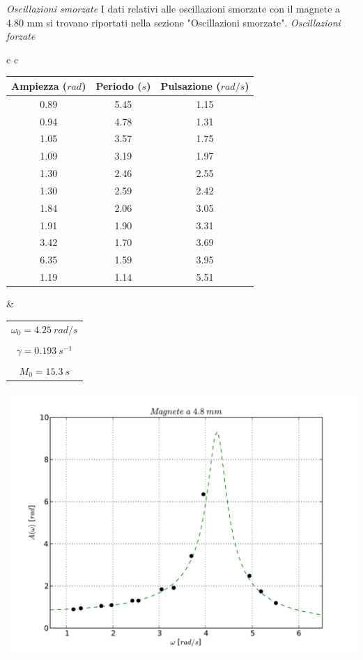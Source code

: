 \textit{Oscillazioni smorzate}
I dati relativi alle oscillazioni smorzate con il magnete a 4.80 mm si trovano riportati nella sezione "Oscillazioni smorzate".
\textit{Oscillazioni forzate}
\begin{center}

\begin{tabular}{c c}

\begin{tabular}{c | c | c}
\textbf{Ampiezza ($rad$)} & \textbf{Periodo ($s$)} & \textbf{Pulsazione ($rad/s$)}\\
\midrule
0.89 & 5.45 & 1.15\\
0.94 & 4.78 & 1.31\\
1.05 & 3.57 & 1.75\\
1.09 & 3.19 & 1.97\\
1.30 & 2.46 & 2.55\\
1.30 & 2.59 & 2.42\\
1.84 & 2.06 & 3.05\\
1.91 & 1.90 & 3.31\\
3.42 & 1.70 & 3.69\\
6.35 & 1.59 & 3.95\\
1.19 & 1.14 & 5.51\\
\end{tabular}

& \hspace{1cm} 

\begin{tabular}{c}
$ \omega_0 = 4.25\ rad/s $\\
\\
$ \gamma = 0.193\ s^{-1}$\\
\\
$ M_0 = 15.3\ s$\\
\end{tabular} 

\end{tabular}

\end{center}
 
\begin{center}

\includegraphics[scale=0.75]{"../grafici/Magnetea48mm"}


\end{center}
 

